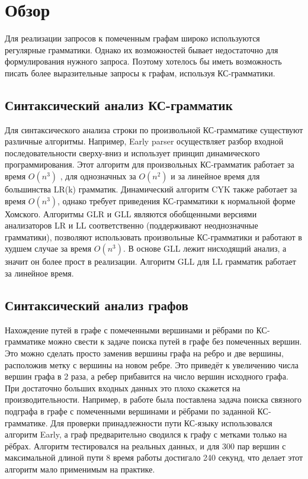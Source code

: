 \documentclass[14pt]{matmex-diploma}
\begin{document}
\section{Обзор}
 Для реализации запросов к помеченным графам широко используются регулярные грамматики. Однако их возможностей бывает недостаточно для формулирования нужного запроса. Поэтому хотелось бы иметь возможность писать более выразительные запросы к графам, используя КС-грамматики.
    \subsection{Синтаксический анализ КС-грамматик}
    Для синтаксического анализа строки по произвольной КС-грамматике существуют различные алгоритмы. Например, Early parser \cite{Early} осуществляет разбор входной последовательности сверху-вниз и использует принцип динамического программирования. Этот алгоритм для произвольных КС-грамматик работает за время $O(n^3)$ , для однозначных за  $O(n^2)$ и за линейное время для большинства LR(k) грамматик. Динамический алгоритм CYK \cite{CYK} также работает за время $O(n^3)$, однако требует приведения КС-грамматики к нормальной форме Хомского. Алгоритмы GLR \cite{glr} и GLL \cite{gll} являются обобщенными версиями анализаторов LR и LL соответственно (поддерживают неоднозначные грамматики), позволяют использовать произвольные КС-грамматики и работают в худшем случае за время  $O(n^3)$. В основе GLL лежит нисходящий анализ, а значит он более прост в реализации. Алгоритм GLL для LL грамматик работает за линейное время.
    \subsection{Синтаксический анализ графов}
    Нахождение путей в графе с помеченными вершинами и рёбрами по КС-грамматике можно свести к задаче поиска путей в графе без помеченных вершин. Это можно сделать просто заменив вершины графа на ребро и две вершины, расположив метку с вершины на новом ребре. Это приведёт к увеличению числа вершин графа в 2 раза, а ребер прибавится на число вершин исходного графа. При достаточно больших входных данных это плохо скажется на производительности. Например, в работе \cite{subgraph} была поставлена задача поиска связного подграфа в графе с помеченными вершинами и рёбрами по заданной КС-грамматике. Для проверки принадлежности пути КС-языку использовался алгоритм Early, а граф предварительно сводился к графу с метками только на рёбрах. Алгоритм тестировался на реальных данных, и для 300 пар вершин с максимальной длиной пути 8 время работы достигало 240 секунд, что делает этот алгоритм мало применимым на практике.
    
\end{document}
